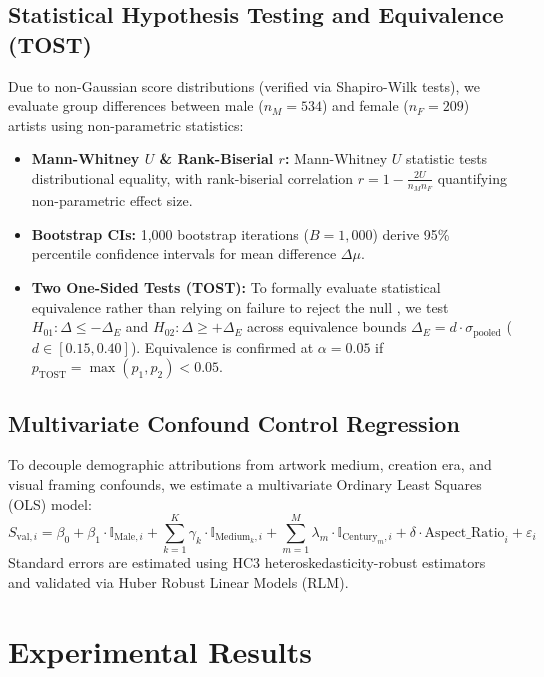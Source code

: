 \documentclass[pdflatex,sn-mathphys-num]{sn-jnl}%
\theoremstyle{thmstyleone}%
\theoremstyle{thmstyletwo}%
\theoremstyle{thmstylethree}%
\begin{document}
\subsection{Statistical Hypothesis Testing and Equivalence (TOST)}
Due to non-Gaussian score distributions (verified via Shapiro-Wilk tests), we evaluate group differences between male ($n_M=534$) and female ($n_F=209$) artists using non-parametric statistics:
\begin{itemize}
    \item \textbf{Mann-Whitney $U$ \& Rank-Biserial $r$:} Mann-Whitney $U$ statistic tests distributional equality, with rank-biserial correlation $r = 1 - \frac{2U}{n_M n_F}$ quantifying non-parametric effect size.
    \item \textbf{Bootstrap CIs:} 1,000 bootstrap iterations ($B=1,000$) derive 95\% percentile confidence intervals for mean difference $\Delta \mu$.
    \item \textbf{Two One-Sided Tests (TOST):} To formally evaluate statistical equivalence rather than relying on failure to reject the null \cite{lakens2017equivalence}, we test $H_{01}: \Delta \le -\Delta_E$ and $H_{02}: \Delta \ge +\Delta_E$ across equivalence bounds $\Delta_E = d \cdot \sigma_{\text{pooled}}$ ($d \in [0.15, 0.40]$). Equivalence is confirmed at $\alpha=0.05$ if $p_{\text{TOST}} = \max(p_1, p_2) < 0.05$.
\end{itemize}

\subsection{Multivariate Confound Control Regression}
To decouple demographic attributions from artwork medium, creation era, and visual framing confounds, we estimate a multivariate Ordinary Least Squares (OLS) model:
\begin{equation}
S_{\text{val}, i} = \beta_0 + \beta_1 \cdot \mathbb{I}_{\text{Male}, i} + \sum_{k=1}^{K} \gamma_k \cdot \mathbb{I}_{\text{Medium}_{k}, i} + \sum_{m=1}^{M} \lambda_m \cdot \mathbb{I}_{\text{Century}_{m}, i} + \delta \cdot \text{Aspect\_Ratio}_i + \varepsilon_i
\end{equation}
Standard errors are estimated using HC3 heteroskedasticity-robust estimators and validated via Huber Robust Linear Models (RLM).


\section{Experimental Results}
\label{sec:results}
\end{document}
